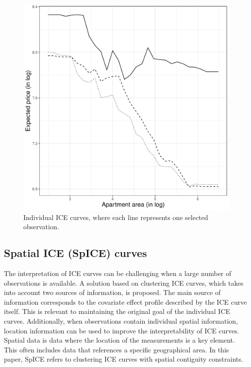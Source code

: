 \documentclass[smallextended,natbib]{svjour3}\usepackage[]{graphicx}\usepackage[]{xcolor}
\begin{document}
\begin{figure}[htpb]
    \centering
    \includegraphics[scale=.5]{figures/fig-3ice-exmp.pdf}
    \caption{Individual ICE curves, where each line represents one selected observation.}
    \label{fig-3ice} 
\end{figure}

\subsection{Spatial ICE (SpICE) curves} 
\label{seccD}

The interpretation of ICE curves can be challenging when a large number of observations is available. A solution based on clustering ICE curves, which takes into account two sources of information, is proposed. The main source of information corresponds to the covariate effect profile described by the ICE curve itself. This is relevant to maintaining the original goal of the individual ICE curves. Additionally, when observations contain individual spatial information, location information can be used to improve the interpretability of ICE curves. Spatial data is data where the location of the measurements is a key element. This often includes data that references a specific geographical area. In this paper, SpICE refers to clustering ICE curves with spatial contiguity constraints.
\end{document}
